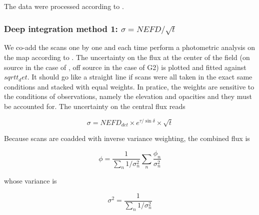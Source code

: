 The data were processed according to .

\subsubsection{Deep integration method 1: $\sigma = NEFD/\sqrt{t}$}


We co-add the scans one by one and each time perform a photometric analysis on
the map according to {}. The uncertainty on
the flux at the center of the field (on source in the case of \hls, off source
in the case of G2) is plotted and fitted against $sqrt{t_det}$. It should go
like a straight line if scans were all taken in the exact same conditions and
stacked with equal weights. In pratice, the weights are sensitive to the
conditions of observations, namely the elevation and opacities  and they must be accounted for. The
uncertainty on the central flux reads

\begin{equation}
\sigma = NEFD_{det}\times e^{\tau/\sin\delta}\times\sqrt{t}
\label{eq:sigma_nefd}
\end{equation}

Because scans are coadded with inverse variance weighting, the combined flux is

\begin{equation}
\phi = \frac{1}{\sum_n 1/\sigma_n^2}\sum_n\frac{\phi_n}{\sigma_n^2}
\end{equation}

whose variance is

\begin{equation}
\sigma^2 = \frac{1}{\sum_n 1/\sigma_n^2}
\end{equation}

